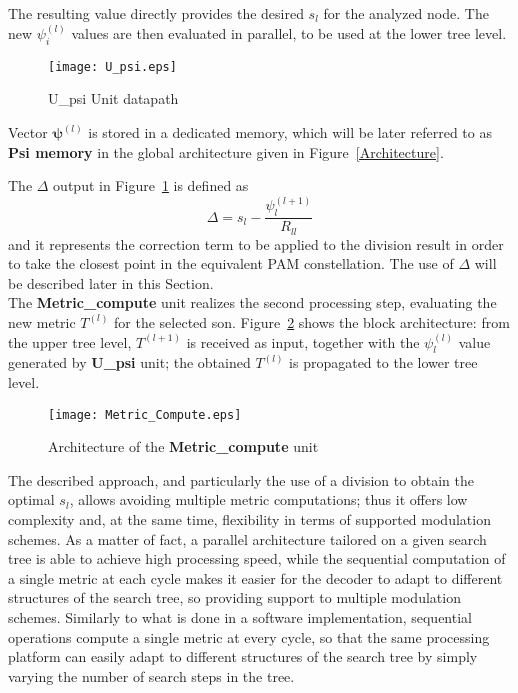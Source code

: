 \documentclass[12pt,onecolumn,draftclsnofoot]{IEEEtran}
\begin{document}
The resulting value
directly provides the desired $s_l$ for the analyzed node.
The new $\psi_i^{(l)}$ values are then evaluated in parallel, to be used at the 
lower tree level. 

\begin{figure}[ht]
    \begin{center}
    \texttt{[image: U\_psi.eps]}
    \caption{U\_psi Unit datapath}
    \label{U_psi}
    \end{center}
\end{figure}
Vector $\boldsymbol{\psi}^{(l)}$ is stored in a dedicated memory, 
which will be later referred to as \textbf{Psi memory} in
the global architecture given in Figure~\ref{Architecture}. 

The $\Delta$ output in Figure~\ref{U_psi} is defined as
\begin{equation*}
\Delta = s_l - \frac{\psi_l^{(l+1)}}{R_{ll}}
\end{equation*}
\noindent and it represents the correction term to be applied to the division result in order 
to take the closest point in the equivalent PAM constellation. The use of $\Delta$ will be described 
later in this Section.\\

The \textbf{Metric\_compute} unit realizes the second processing step, 
evaluating the new metric $T^{(l)}$ for the selected son.
Figure~\ref{Metric_block} shows the block architecture: from the upper tree level,
$T^{(l+1)}$ is received as input, together with the $\psi_l^{(l)}$ value generated
by \textbf{U\_psi} unit; the obtained $T^{(l)}$ is propagated to the lower tree level.
\begin{figure}[ht]
    \begin{center}
    \texttt{[image: Metric\_Compute.eps]}
    \caption{Architecture of the \textbf{Metric\_compute} unit}
    \label{Metric_block}
    \end{center}
\end{figure}

The described approach, and particularly the use of a division to obtain the 
optimal $s_l$, allows avoiding multiple metric computations; thus it
offers low complexity and, at the same time, flexibility in terms of
supported modulation schemes.
As a matter of fact, a parallel architecture tailored on a given search tree
is able to achieve high processing speed, while
the sequential computation of a single metric at each cycle
makes it easier for the decoder to adapt to different
structures of the search tree, so providing support to multiple modulation
schemes. Similarly to what is done in a software implementation, sequential 
operations compute a single metric at every cycle, so that the same processing 
platform can easily adapt to different structures of the search tree by
simply varying the number of search steps in the tree.
\end{document}
